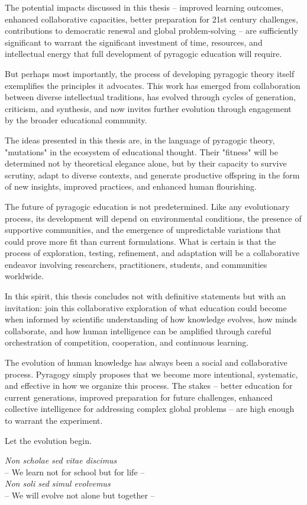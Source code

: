 The potential impacts discussed in this thesis -- improved learning outcomes, enhanced collaborative capacities, better preparation for 21st century challenges, contributions to democratic renewal and global problem-solving -- are sufficiently significant to warrant the significant investment of time, resources, and intellectual energy that full development of pyragogic education will require.

But perhaps most importantly, the process of developing pyragogic theory itself exemplifies the principles it advocates. This work has emerged from collaboration between diverse intellectual traditions, has evolved through cycles of generation, criticism, and synthesis, and now invites further evolution through engagement by the broader educational community.

The ideas presented in this thesis are, in the language of pyragogic theory, "mutations" in the ecosystem of educational thought. Their "fitness" will be determined not by theoretical elegance alone, but by their capacity to survive scrutiny, adapt to diverse contexts, and generate productive offspring in the form of new insights, improved practices, and enhanced human flourishing.

The future of pyragogic education is not predetermined. Like any evolutionary process, its development will depend on environmental conditions, the presence of supportive communities, and the emergence of unpredictable variations that could prove more fit than current formulations. What is certain is that the process of exploration, testing, refinement, and adaptation will be a collaborative endeavor involving researchers, practitioners, students, and communities worldwide.

In this spirit, this thesis concludes not with definitive statements but with an invitation: join this collaborative exploration of what education could become when informed by scientific understanding of how knowledge evolves, how minds collaborate, and how human intelligence can be amplified through careful orchestration of competition, cooperation, and continuous learning.

The evolution of human knowledge has always been a social and collaborative process. Pyragogy simply proposes that we become more intentional, systematic, and effective in how we organize this process. The stakes -- better education for current generations, improved preparation for future challenges, enhanced collective intelligence for addressing complex global problems -- are high enough to warrant the experiment.

Let the evolution begin.

\vspace{1cm}

\begin{center}
	\textit{Non scholae sed vitae discimus} \\
	-- We learn not for school but for life -- \\
	\vspace{0.5cm}
	\textit{Non soli sed simul evolvemus} \\
	-- We will evolve not alone but together --
\end{center}